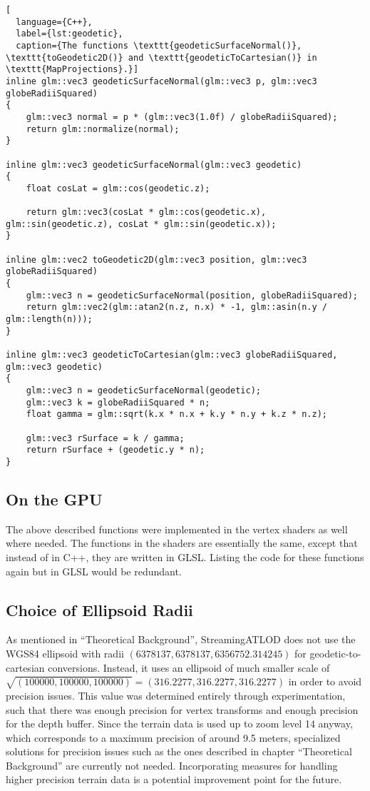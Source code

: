 \begin{lstlisting}[
  language={C++},
  label={lst:geodetic},
  caption={The functions \texttt{geodeticSurfaceNormal()}, \texttt{toGeodetic2D()} and \texttt{geodeticToCartesian()} in \texttt{MapProjections}.}]
inline glm::vec3 geodeticSurfaceNormal(glm::vec3 p, glm::vec3 globeRadiiSquared)
{
    glm::vec3 normal = p * (glm::vec3(1.0f) / globeRadiiSquared);
    return glm::normalize(normal);
}

inline glm::vec3 geodeticSurfaceNormal(glm::vec3 geodetic)
{
    float cosLat = glm::cos(geodetic.z);

    return glm::vec3(cosLat * glm::cos(geodetic.x), glm::sin(geodetic.z), cosLat * glm::sin(geodetic.x));
}

inline glm::vec2 toGeodetic2D(glm::vec3 position, glm::vec3 globeRadiiSquared)
{
    glm::vec3 n = geodeticSurfaceNormal(position, globeRadiiSquared);
    return glm::vec2(glm::atan2(n.z, n.x) * -1, glm::asin(n.y / glm::length(n)));
}

inline glm::vec3 geodeticToCartesian(glm::vec3 globeRadiiSquared, glm::vec3 geodetic)
{
    glm::vec3 n = geodeticSurfaceNormal(geodetic);
    glm::vec3 k = globeRadiiSquared * n;
    float gamma = glm::sqrt(k.x * n.x + k.y * n.y + k.z * n.z);

    glm::vec3 rSurface = k / gamma;
    return rSurface + (geodetic.y * n);
}
\end{lstlisting}


\subsection{On the GPU}
The above described functions were implemented in the vertex shaders 
as well where needed. The functions in the shaders are essentially 
the same, except that instead of in C++, they are written in GLSL.
Listing the code for these functions again but in GLSL would be redundant.

\subsection{Choice of Ellipsoid Radii}
As mentioned in ``Theoretical Background'', 
StreamingATLOD does not use the WGS84 ellipsoid with radii $(6378137, 6378137, 6356752.314245)$ for geodetic-to-cartesian conversions.
Instead, it uses an ellipsoid of much smaller scale of $\sqrt{(100000, 100000, 100000)} = (316.2277, 316.2277, 316.2277)$ in order to avoid precision issues.
This value was determined entirely through experimentation, such that there was enough precision for vertex transforms 
and enough precision for the depth buffer.
Since the terrain data is used up to zoom level 14 anyway, which corresponds to a 
maximum precision of around 9.5 meters\cite{maptilerzoom}, specialized solutions for precision issues 
such as the ones described in chapter ``Theoretical Background'' are currently not needed.
Incorporating measures for handling higher precision terrain data is 
a potential improvement point for the future.

